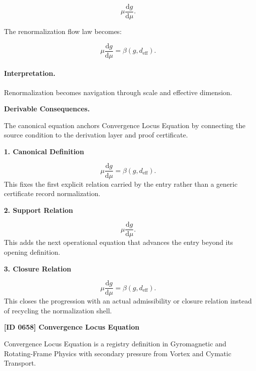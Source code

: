 \begin{equation}
\mu\frac{\mathrm{d}g}{\mathrm{d}\mu}.
\end{equation}

The renormalization flow law becomes:

\begin{equation}
\boxed{
\mu\frac{\mathrm{d}g}{\mathrm{d}\mu}
=
\beta(g,d_{\mathrm{eff}}).
}
\end{equation}

\paragraph{Interpretation.}
Renormalization becomes navigation through scale and effective dimension.

\par\vspace{0.35em}
\noindent\textbf{Derivable Consequences.}\quad
\begingroup
\footnotesize
\raggedright
The canonical equation anchors Convergence Locus Equation by connecting the source condition to the derivation layer and proof certificate.
\par\endgroup

\noindent\textbf{1. Canonical Definition}\par
\[
\mu\frac{\mathrm{d}g}{\mathrm{d}\mu} = \beta(g,d_{\mathrm{eff}}).
\]
\noindent This fixes the first explicit relation carried by the entry rather than a generic certificate record normalization.\par
\noindent\textbf{2. Support Relation}\par
\[
\mu\frac{\mathrm{d}g}{\mathrm{d}\mu}.
\]
\noindent This adds the next operational equation that advances the entry beyond its opening definition.\par
\noindent\textbf{3. Closure Relation}\par
\[
\boxed{ \mu\frac{\mathrm{d}g}{\mathrm{d}\mu} = \beta(g,d_{\mathrm{eff}}). }
\]
\noindent This closes the progression with an actual admissibility or closure relation instead of recycling the normalization shell.\par

\clearpage
\noindent\textbf{[ID 0658] Convergence Locus Equation}\par
\vspace{0.35em}
\begingroup\small
{}
Convergence Locus Equation is a registry definition in Gyromagnetic and Rotating-Frame Physics with secondary pressure from Vortex and Cymatic Transport.

